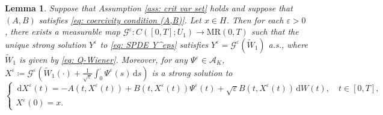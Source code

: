 \documentclass{amsart}
\newcommand{\dd}{\,\mathrm{d}}
\renewcommand{\MR}{\mathrm{MR}}
\newcommand{\<}{\langle}
\newcommand{\?}{\rangle}
\theoremstyle{plain}
\theoremstyle{remark}
\theoremstyle{plain}
\newtheorem{lemma}[theorem]{Lemma}
\numberwithin{equation}{section}
\newcommand{\eps}{\varepsilon}
\begin{document}
\begin{lemma}\label{lem: yamada-watanabe}
Suppose that Assumption \ref{ass: crit var set} holds and suppose that $(A,B)$ satisfies \eqref{eq: coercivity condition (A,B)}. Let $x\in H$. Then for each $\eps>0$, there exists a measurable map $\mathcal{G}^\eps\colon C([0,T];U_1)\to\MR(0,T)$  such that the unique strong solution $Y^\eps$ to
  \eqref{eq: SPDE Y^eps} satisfies $Y^\eps=\mathcal{G}^{\eps}(\tilde{W}_1)$ a.s., where $\tilde{W}_1$ is given by \eqref{eq: Q-Wiener}.
  Moreover, for any $\Psi^\eps\in \mathcal{A}_K$,
  $X^\eps\coloneqq \mathcal{G}^{\eps}({\tilde{W}_1}(\cdot)+\frac{1}{\sqrt{\eps}}\int_0^{\cdot}{\Psi}^{\eps}(s)\dd s)$ is a strong solution to
  \begin{equation}\label{eq: SPDE X^eps}
  \begin{cases}
    \dd X^\eps(t)=-A(t,X^\eps(t))+B(t,X^\eps(t))\Psi^\eps(t)+\sqrt{\eps}B(t,X^\eps(t))\dd W(t), \quad t\in[0,T],\\
    X^\eps(0)=x.
  \end{cases}
  \end{equation}
\end{lemma}
\end{document}
